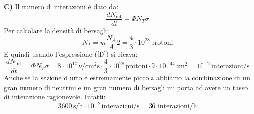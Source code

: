 \textbf{C)} Il numero di interazioni è dato da:
\begin{equation}\label{D}
    \frac{dN_{\text{int}}}{dt}=\Phi N_T\sigma
\end{equation}
Per calcolare la densità di bersagli:
\begin{equation}
    N_T=m\frac{N_A}{A}2=\frac{4}{3}\cdot10^{28}\,\mathrm{protoni}
\end{equation}
E quindi usando l'espressione (\ref{D}) si ricava:
\begin{equation}
    \frac{dN_{\text{int}}}{dt}=\Phi N_T\sigma=8\cdot10^{12}\,\nu/\mathrm{cm}^2\mathrm{s}\cdot\frac{4}{3}\cdot10^{28}\,\mathrm{protoni}\cdot9\cdot10^{-44}\,\mathrm{cm}^2=10^{-2}\,\mathrm{interazioni}/\mathrm{s}
\end{equation}
Anche se la sezione d'urto è estremamente piccola abbiamo la combinazione di un gran numero di neutrini e un gran numero di bersagli mi porta ad avere un tasso di interazione ragionevole. Infatti:
\begin{equation}
    3600\,\mathrm{s}/\mathrm{h}\cdot10^{-2}\,\mathrm{interazioni}/\mathrm{s}=36\,\,\mathrm{interazioni}/\mathrm{h}
\end{equation}